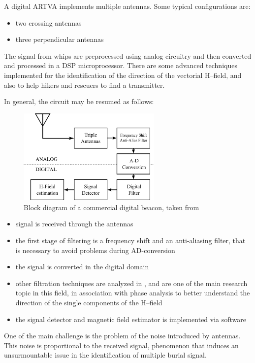 A digital ARTVA implements multiple antennas. Some typical configurations are:
\begin{itemize}
\item two crossing antennas
\item three perpendicular antennas
\end{itemize}
The signal from whips are preprocessed using analog circuitry and then converted and processed in a DSP microprocessor. There are some advanced techniques\citep{Salos2007} implemented for the identification of the direction of the vectorial H--field, and also to help hikers and rescuers to find a transmitter. 

In general, the circuit may be resumed as follows:

\begin{figure}
	\centering
	\includegraphics[width=7cm]{ch1/img/img_schema_arva.pdf}
	\caption{Block diagram of a commercial digital beacon, taken from \citep{Salos2007}}
	\forceversofloat
\end{figure}


\begin{itemize}
\item signal is received through the antennas
\item the first stage of filtering is a frequency shift and  an anti-aliasing filter, that is necessary to avoid problems during AD-conversion
\item the signal is converted in the digital domain
\item other filtration techniques are analyzed  in \citep{Salos2007}, and are one of the main research topic in this field, in association with phase analysis to better understand the direction of the single components of the H--field
\item the signal detector and magnetic field estimator is implemented via software
\end{itemize}

One of the main challenge is the problem of the noise introduced by antennas. This noise is proportional to the received signal, phenomenon that induces an unsurmountable issue in the identification of multiple burial signal.

